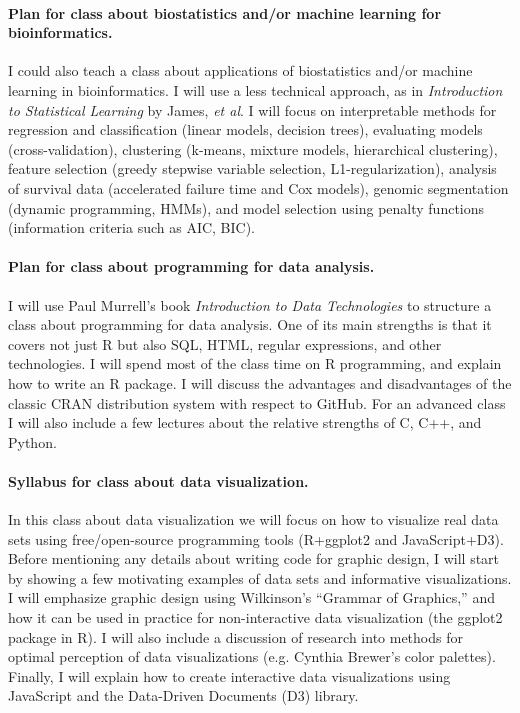 \documentclass{article}
\begin{document}
\paragraph{Plan for class about biostatistics and/or machine learning for
  bioinformatics.}
I could also teach a class about applications of biostatistics and/or
machine learning in bioinformatics. I will use a less technical
approach, as in \emph{Introduction to Statistical Learning} by James,
\emph{et al}. I will focus on interpretable methods for regression and
classification (linear models, decision trees), evaluating models
(cross-validation), clustering (k-means, mixture models, hierarchical
clustering), feature selection (greedy stepwise variable selection,
L1-regularization), analysis of survival data (accelerated failure
time and Cox models), genomic segmentation (dynamic programming,
HMMs), and model selection using penalty functions (information
criteria such as AIC, BIC).

\paragraph{Plan for class about programming for data analysis.} I will
use Paul Murrell's book \emph{Introduction to Data Technologies} to
structure a class about programming for data analysis. One of its main
strengths is that it covers not just R but also SQL, HTML, regular
expressions, and other technologies. I will spend most of the class
time on R programming, and explain how to write an R package. I will
discuss the advantages and disadvantages of the classic CRAN
distribution system with respect to GitHub. For an advanced class I
will also include a few lectures about the relative strengths of C,
C++, and Python.

\paragraph{Syllabus for class about data visualization.} In this class
about data visualization we will focus on how to visualize real data
sets using free/open-source programming tools (R+ggplot2 and
JavaScript+D3). Before mentioning any details about writing code for
graphic design, I will start by showing a few motivating examples of
data sets and informative visualizations. I will emphasize graphic
design using Wilkinson's ``Grammar of Graphics,'' and how it can be
used in practice for non-interactive data visualization (the ggplot2
package in R). I will also include a discussion of research into
methods for optimal perception of data visualizations (e.g. Cynthia
Brewer's color palettes). Finally, I will explain how to create
interactive data visualizations using JavaScript and the Data-Driven
Documents (D3) library.
\end{document}
